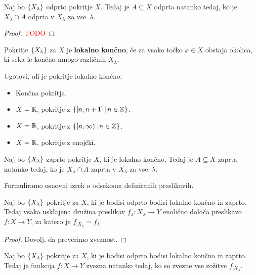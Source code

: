 \begin{lema}
    Naj bo $\{X_\lambda\}$ odprto pokritje $X$. Tedaj je $A \subseteq X$ odprta natanko tedaj, ko je $X_\lambda \cap A$ odprta v $X_\lambda$ za vse~$\lambda$.
\end{lema}

\begin{proof}
    \textcolor{red}{TODO}
\end{proof}

\begin{definicija}
    Pokritje $\{X_\lambda\}$ za $X$ je \textbf{lokalno končno}, če za vsako točko $x \in X$ obstaja okolica, ki seka le končno mnogo različnih $X_\lambda$.
\end{definicija}

\begin{primer}
    Ugotovi, ali je pokritje lokalno končno:
    \begin{itemize}
        \item Končna pokritja.
        \item $X = \mathbb{R}$, pokritje z $\{[n, n+1] \,|\, n \in \mathbb{Z}\}$.
        \item $X = \mathbb{R}$, pokritje z $\{[n, \infty) \,|\, n \in \mathbb{Z}\}$.
        \item $X = \mathbb{R}$, pokritje z enojčki.
    \end{itemize}
\end{primer}

\begin{lema}
    Naj bo $\{X_\lambda\}$ zaprto pokritje $X$, ki je lokalno končno. Tedaj je $A \subseteq X$ zaprta natanko tedaj, ko je $X_\lambda \cap A$ zaprta v $X_\lambda$ za vse~$\lambda$.
\end{lema}

Formuliramo osnovni izrek o odsekoma definiranih preslikavih.
\begin{izrek}
    Naj bo $\{X_\lambda\}$ pokritje za $X$, ki je bodisi odprto bodisi lokalno končno in zaprto. Tedaj vsaka usklajena družina preslikav $f_\lambda: X_\lambda \to Y$ enolično določa preslikavo $f: X \to Y$, za katero je $f_{|X_\lambda} = f_\lambda$.
\end{izrek}

\begin{proof}
    Dovolj, da preverimo zveznost.
\end{proof}

\begin{posledica}
    Naj bo $\{X_\lambda\}$ pokritje za $X$, ki je bodisi odprto bodisi lokalno končno in zaprto. Tedaj je funkcija $f: X \to Y$ zvezna natanko tedaj, ko so zvezne vse zožitve $f_{|X_\lambda}$.
\end{posledica}

